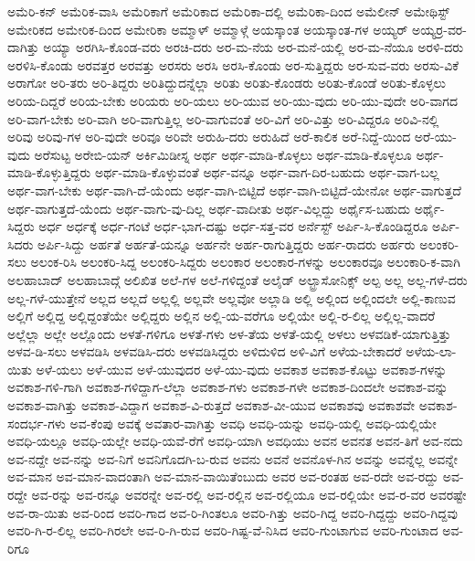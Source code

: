 {ಅಮೆರಿ-ಕನ್
ಅಮೆರಿಕ-ವಾಸಿ
ಅಮೆರಿಕಾಗೆ
ಅಮೆರಿಕಾದ
ಅಮೆರಿಕಾ-ದಲ್ಲಿ
ಅಮೆರಿಕಾ-ದಿಂದ
ಅಮೆಲೀನ್
ಅಮೇಥಿಸ್ಟ್
ಅಮೇರಿಕದ
ಅಮೇರಿಕ-ದಿಂದ
ಅಮೇರಿಕಾ
ಅಮ್ಮಾಳ್
ಅಮ್ಮಾಳ್ಗೆ
ಅಯಸ್ಕಾಂತ
ಅಯಸ್ಕಾಂತ-ಗಳ
ಅಯ್ಯರ್
ಅಯ್ಯರ್ರ-ವರ-ದಾಗಿತ್ತು
ಅಯ್ಯಾ
ಅರಗಿಸಿ-ಕೊಂಡ-ವರು
ಅರಚಿ-ದರು
ಅರ-ಮ-ನೆಯ
ಅರ-ಮನೆ-ಯಲ್ಲಿ
ಅರ-ಮ-ನೆಯೂ
ಅರಳಿ-ದರು
ಅರಳಿಸಿ-ಕೊಂಡು
ಅರವತ್ತರ
ಅರವತ್ತು
ಅರಸರು
ಅರಸಿ
ಅರಸಿ-ಕೊಂಡು
ಅರ-ಸುತ್ತಿದ್ದರು
ಅರ-ಸುವ-ವರು
ಅರಸು-ವಿಕೆ
ಅರಾಗೋ
ಅರಿ-ತರು
ಅರಿ-ತಿದ್ದರು
ಅರಿತಿದ್ದುದನ್ನೆಲ್ಲಾ
ಅರಿತು
ಅರಿತು-ಕೊಂಡರು
ಅರಿತು-ಕೊಂಡೆ
ಅರಿತು-ಕೊಳ್ಳಲು
ಅರಿಯ-ದಿದ್ದರೆ
ಅರಿಯ-ಬೇಕು
ಅರಿಯರು
ಅರಿ-ಯಲು
ಅರಿ-ಯುವ
ಅರಿ-ಯು-ವುದು
ಅರಿ-ಯು-ವುದೇ
ಅರಿ-ವಾಗದ
ಅರಿ-ವಾಗ-ಬೇಕು
ಅರಿ-ವಾಗಿ
ಅರಿ-ವಾಗುತ್ತಿಲ್ಲ
ಅರಿ-ವಾಗುವಂತೆ
ಅರಿ-ವಿಗೆ
ಅರಿ-ವಿತ್ತು
ಅರಿ-ವಿದ್ದರೂ
ಅರಿವಿ-ನಲ್ಲಿ
ಅರಿವು
ಅರಿವು-ಗಳ
ಅರಿ-ವುದೇ
ಅರಿವೂ
ಅರಿವೇ
ಅರುಹಿ-ದರು
ಅರುಹಿದೆ
ಅರೆ-ಕಾಲಿಕ
ಅರೆ-ನಿದ್ದೆ-ಯಿಂದ
ಅರೆ-ಯು-ವುದು
ಅರೆಸುಟ್ಟ
ಅರೇಬಿ-ಯನ್
ಅರ್ಕಿಮಿಡೀಸ್ನ
ಅರ್ಥ
ಅರ್ಥ-ಮಾಡಿ-ಕೊಳ್ಳಲು
ಅರ್ಥ-ಮಾಡಿ-ಕೊಳ್ಳಲೂ
ಅರ್ಥ-ಮಾಡಿ-ಕೊಳ್ಳುತ್ತಿದ್ದರು
ಅರ್ಥ-ಮಾಡಿ-ಕೊಳ್ಳುವಂತೆ
ಅರ್ಥ-ವನ್ನೂ
ಅರ್ಥ-ವಾಗ-ದಿರ-ಬಹುದು
ಅರ್ಥ-ವಾಗ-ಬಲ್ಲ
ಅರ್ಥ-ವಾಗ-ಬೇಕು
ಅರ್ಥ-ವಾಗಿ-ದೆ-ಯೆಂದು
ಅರ್ಥ-ವಾಗಿ-ಬಿಟ್ಟಿದೆ
ಅರ್ಥ-ವಾಗಿ-ಬಿಟ್ಟಿದೆ-ಯೇನೋ
ಅರ್ಥ-ವಾಗುತ್ತದೆ
ಅರ್ಥ-ವಾಗುತ್ತದೆ-ಯೆಂದು
ಅರ್ಥ-ವಾಗು-ವು-ದಿಲ್ಲ
ಅರ್ಥ-ವಾದೀತು
ಅರ್ಥ-ವಿಲ್ಲದ್ದು
ಅರ್ಥೈಸ-ಬಹುದು
ಅರ್ಥೈ-ಸಿದ್ದರು
ಅರ್ಧ
ಅರ್ಧಕ್ಕೆ
ಅರ್ಧ-ಗಂಟೆ
ಅರ್ಧ-ಭಾಗ-ದಷ್ಟು
ಅರ್ಧ-ಸತ್ತ-ವರ
ಅರ್ನೆಸ್ಟ್
ಅರ್ಪಿ-ಸಿ-ಕೊಂಡಿದ್ದರೂ
ಅರ್ಪಿ-ಸಿದರು
ಅರ್ಪಿ-ಸಿದ್ದು
ಅರ್ಹತೆ
ಅರ್ಹತೆ-ಯನ್ನೂ
ಅರ್ಹನೇ
ಅರ್ಹ-ರಾಗುತ್ತಿದ್ದರು
ಅರ್ಹ-ರಾದರು
ಅರ್ಹರು
ಅಲಂಕರಿ-ಸಲು
ಅಲಂಕ-ರಿಸಿ
ಅಲಂಕರಿ-ಸಿದ್ದ
ಅಲಂಕರಿ-ಸಿದ್ದರು
ಅಲಂಕಾರ
ಅಲಂಕಾರ-ಗಳನ್ನು
ಅಲಂಕಾರವೂ
ಅಲಂಕಾರಿ-ಕ-ವಾಗಿ
ಅಲಹಾಬಾದ್
ಅಲಹಾಬಾದ್ಗೆ
ಅಲಿಖಿತ
ಅಲೆ-ಗಳ
ಅಲೆ-ಗಳಿದ್ದಂತೆ
ಅಲೈಡ್
ಅಲ್ಟ್ರಾಸೋನಿಕ್ಸ್
ಅಲ್ಪ
ಅಲ್ಲ
ಅಲ್ಲ-ಗಳೆ-ದರು
ಅಲ್ಲ-ಗಳೆ-ಯುತ್ತೇನೆ
ಅಲ್ಲದ
ಅಲ್ಲದೆ
ಅಲ್ಲಲ್ಲಿ
ಅಲ್ಲವೇ
ಅಲ್ಲವೋ
ಅಲ್ಲಾಡಿ
ಅಲ್ಲಿ
ಅಲ್ಲಿಂದ
ಅಲ್ಲಿಂದಲೇ
ಅಲ್ಲಿ-ಕಾಣುವ
ಅಲ್ಲಿಗೆ
ಅಲ್ಲಿದ್ದ
ಅಲ್ಲಿದ್ದಂತೆಯೇ
ಅಲ್ಲಿದ್ದರು
ಅಲ್ಲಿನ
ಅಲ್ಲಿ-ಯ-ವರೆಗೂ
ಅಲ್ಲಿಯೇ
ಅಲ್ಲಿ-ರ-ಲಿಲ್ಲ
ಅಲ್ಲಿಲ್ಲ-ವಾದರೆ
ಅಲ್ಲೆಲ್ಲಾ
ಅಲ್ಲೇ
ಅಲ್ಲೊಂದು
ಅಳತೆ-ಗಳಿಗೂ
ಅಳತೆ-ಗಳು
ಅಳ-ತೆಯ
ಅಳತೆ-ಯಲ್ಲಿ
ಅಳಲು
ಅಳವಡಿಕೆ-ಯಾಗುತ್ತಿತ್ತು
ಅಳವ-ಡಿ-ಸಲು
ಅಳವಡಿಸಿ
ಅಳವಡಿಸಿ-ದರು
ಅಳವಡಿಸಿದ್ದರು
ಅಳಿದುಳಿದ
ಅಳಿ-ವಿಗೆ
ಅಳೆಯ-ಬೇಕಾದರೆ
ಅಳೆಯ-ಲಾ-ಯಿತು
ಅಳೆ-ಯಲು
ಅಳೆ-ಯುವ
ಅಳೆ-ಯುವುದರ
ಅಳೆ-ಯು-ವುದು
ಅವಕಾಶ
ಅವಕಾಶ-ಕೊಟ್ಟು
ಅವಕಾಶ-ಗಳನ್ನು
ಅವಕಾಶ-ಗಳಿ-ಗಾಗಿ
ಅವಕಾಶ-ಗಳಿದ್ದಾಗ-ಲೆಲ್ಲಾ
ಅವಕಾಶ-ಗಳು
ಅವಕಾಶ-ಗಳೇ
ಅವಕಾಶ-ದಿಂದಲೇ
ಅವಕಾಶ-ವನ್ನು
ಅವಕಾಶ-ವಾಗಿತ್ತು
ಅವಕಾಶ-ವಿದ್ದಾಗ
ಅವಕಾಶ-ವಿ-ರುತ್ತದೆ
ಅವಕಾಶ-ವೀ-ಯುವ
ಅವಕಾಶವು
ಅವಕಾಶವೇ
ಅವಕಾಶ-ಸಂದರ್ಭ-ಗಳು
ಅವ-ಕೆಂಪು
ಅವಕ್ಕೆ
ಅವತಾರ-ವಾಗಿತ್ತು
ಅವಧಿ
ಅವಧಿ-ಯನ್ನು
ಅವಧಿ-ಯಲ್ಲಿ
ಅವಧಿ-ಯಲ್ಲಿಯೇ
ಅವಧಿ-ಯಲ್ಲೂ
ಅವಧಿ-ಯಲ್ಲೇ
ಅವಧಿ-ಯವೆ-ರೆಗೆ
ಅವಧಿ-ಯಾಗಿ
ಅವಧಿಯು
ಅವನ
ಅವನತ
ಅವನ-ತಿಗೆ
ಅವ-ನದು
ಅವ-ನದ್ದೇ
ಅವ-ನನ್ನು
ಅವ-ನಿಗೆ
ಅವನಿಗೊದಗಿ-ಬ-ರುವ
ಅವನು
ಅವನೆ
ಅವನೊಳ-ಗಿನ
ಅವನ್ನು
ಅವನ್ನೆಲ್ಲ
ಅವನ್ನೇ
ಅವ-ಮಾನ
ಅವ-ಮಾನ-ವಾದಂತಾಗಿ
ಅವ-ಮಾನ-ವಾಯಿತೆಂಬುದು
ಅವರ
ಅವ-ರಂತಹ
ಅವ-ರದೇ
ಅವ-ರದ್ದು
ಅವ-ರದ್ದೇ
ಅವ-ರನ್ನು
ಅವ-ರನ್ನೂ
ಅವರನ್ನೇ
ಅವ-ರಲ್ಲಿ
ಅವ-ರಲ್ಲಿನ
ಅವ-ರಲ್ಲಿಯೂ
ಅವ-ರಲ್ಲಿಯೇ
ಅವ-ರ-ವರ
ಅವರಷ್ಟೇ
ಅವ-ರಾ-ಯಿತು
ಅವ-ರಿಂದ
ಅವರಿ-ಗಾದ
ಅವ-ರಿ-ಗಿಂತಲೂ
ಅವರಿ-ಗಿತ್ತು
ಅವರಿ-ಗಿದ್ದ
ಅವರಿ-ಗಿದ್ದದ್ದು
ಅವರಿ-ಗಿದ್ದವು
ಅವರಿ-ಗಿ-ರ-ಲಿಲ್ಲ
ಅವರಿ-ಗಿರಲೇ
ಅವ-ರಿ-ಗಿ-ರುವ
ಅವರಿ-ಗಿಷ್ಟ-ವೆ-ನಿಸಿದ
ಅವರಿ-ಗುಂಟಾಗುವ
ಅವರಿ-ಗುಂಟಾದ
ಅವ-ರಿಗೂ
}
